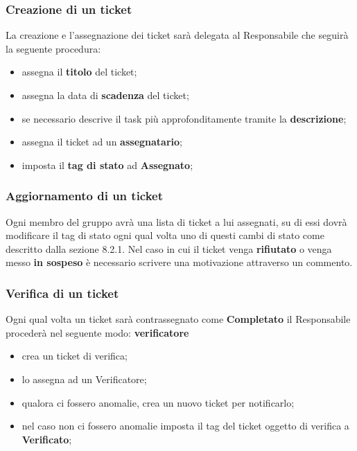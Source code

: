 		\subsubsection{Creazione di un ticket}
		La creazione e l'assegnazione dei ticket sarà delegata al Responsabile che seguirà la seguente procedura:
		\begin{itemize}
			\item assegna il \textbf{titolo} del ticket;
			\item assegna la data di \textbf{scadenza} del ticket;
			\item se necessario descrive il task più approfonditamente tramite la \textbf{descrizione};
			\item assegna il ticket ad un \textbf{assegnatario};
			\item imposta il \textbf{tag di stato} ad \textbf{Assegnato};
		\end{itemize}
		\subsubsection{Aggiornamento di un ticket}
		Ogni membro del gruppo avrà una lista di ticket a lui assegnati, su di essi dovrà modificare il tag di stato ogni qual volta uno di questi cambi di stato come descritto dalla sezione 8.2.1. Nel caso in cui il ticket venga \textbf{rifiutato} o venga messo \textbf{in sospeso} è necessario scrivere una motivazione attraverso un commento.
		\subsubsection{Verifica di un ticket}
		Ogni qual volta un ticket sarà contrassegnato come \textbf{Completato} il Responsabile procederà nel seguente modo: \textbf{verificatore}
		\begin{itemize}
			\item crea un ticket di verifica;
			\item lo assegna ad un Verificatore;
			\item qualora ci fossero anomalie, crea un nuovo ticket per notificarlo;
			\item nel caso non ci fossero anomalie imposta il tag del ticket oggetto di verifica a \textbf{Verificato};
		\end{itemize}
		